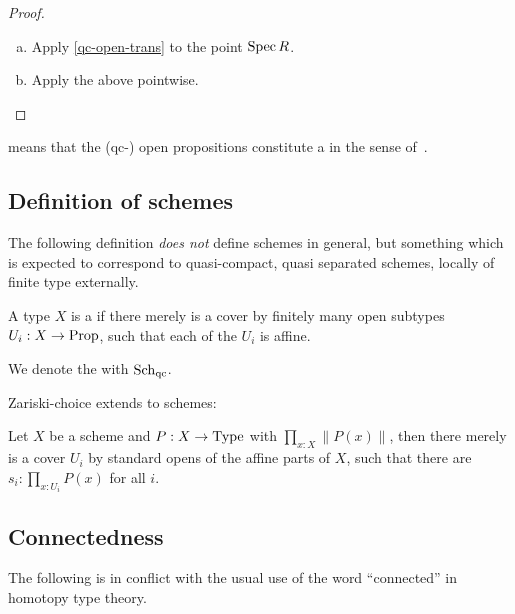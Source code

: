 \begin{proof}
  \begin{enumerate}[(a)]
  \item Apply \cref{qc-open-trans} to the point $\operatorname{Spec} R$.
  \item Apply the above pointwise.
  \end{enumerate}
\end{proof}

\begin{remark}
   means that
  the (qc-) open propositions constitute a 
  in the sense of~\cite{rosolini-phd-thesis}.
\end{remark}

\subsection{Definition of schemes}

The following definition \emph{does not} define schemes in general,
but something which is expected to correspond to quasi-compact, quasi separated schemes,
locally of finite type externally.

\begin{definition}%
  \label{schemes}
  A type $X$ is a 
  if there merely is a cover by finitely many open subtypes $U_i:X\to\mathrm{Prop}$,
  such that each of the $U_i$ is affine.
\end{definition}

\begin{definition}
  \label{type-of-schemes}
  We denote the  with $\Sch$\index{$\Sch$}.
\end{definition}

Zariski-choice  extends to schemes:

\begin{proposition}%
  \label{zariski-choice-scheme}
  Let $X$ be a scheme and $P:X\to \mathrm{Type}$ with $\prod_{x:X}\|P(x)\|$,
  then there merely is a cover $U_i$ by standard opens of the affine parts of $X$,
  such that there are $s_i:\prod_{x:U_i}P(x)$ for all $i$.
\end{proposition}

\subsection{Connectedness}
The following is in conflict with the usual use of the word ``connected'' in homotopy type theory.

